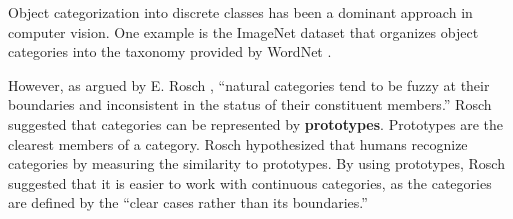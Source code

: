 


Object categorization into discrete classes has been a dominant approach in computer vision. One example is the ImageNet dataset that organizes object categories into the taxonomy provided by WordNet \cite{Fellbaum1998}. 


However, as argued by E. Rosch \cite{Rosch1978}, ``natural categories tend to be fuzzy at their boundaries and inconsistent in the status of their constituent members.'' Rosch suggested that categories can be represented by {\bf prototypes}. Prototypes are the clearest members of a category. Rosch hypothesized that humans recognize categories by measuring the similarity to prototypes. 
By using prototypes, Rosch \cite{Rosch1978} suggested that it is easier to work with continuous categories, as the categories are defined by the ``clear cases rather than its boundaries.''









    







